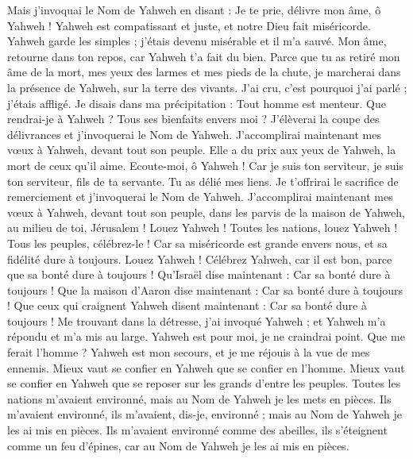 \begin{multicols}{2}
Mais j'invoquai le Nom de Yahweh en disant : Je te prie, délivre mon âme, ô Yahweh !
Yahweh est compatissant et juste, et notre Dieu fait miséricorde.
Yahweh garde les simples ; j'étais devenu misérable et il m'a sauvé.
Mon âme, retourne dans ton repos, car Yahweh t'a fait du bien.
Parce que tu as retiré mon âme de la mort, mes yeux des larmes et mes pieds de la chute,
je marcherai dans la présence de Yahweh, sur la terre des vivants.
J'ai cru, c'est pourquoi j'ai parlé ; j'étais affligé.
Je disais dans ma précipitation : Tout homme est menteur.
Que rendrai-je à Yahweh ? Tous ses bienfaits envers moi ?
J’élèverai la coupe des délivrances et j'invoquerai le Nom de Yahweh.
J’accomplirai maintenant mes vœux à Yahweh, devant tout son peuple.
Elle a du prix aux yeux de Yahweh, la mort de ceux qu’il aime.
Ecoute-moi, ô Yahweh ! Car je suis ton serviteur, je suis ton serviteur, fils de ta servante. Tu as délié mes liens.
Je t’offrirai le sacrifice de remerciement et j'invoquerai le Nom de Yahweh.
J’accomplirai maintenant mes vœux à Yahweh, devant tout son peuple,
dans les parvis de la maison de Yahweh, au milieu de toi, Jérusalem ! Louez Yahweh !
\VerseOne{}Toutes les nations, louez Yahweh ! Tous les peuples, célébrez-le !
Car sa miséricorde est grande envers nous, et sa fidélité dure à toujours. Louez Yahweh !
\VerseOne{}Célébrez Yahweh, car il est bon, parce que sa bonté dure à toujours !
Qu'Israël dise maintenant : Car sa bonté dure à toujours !
Que la maison d'Aaron dise maintenant : Car sa bonté dure à toujours !
Que ceux qui craignent Yahweh disent maintenant : Car sa bonté dure à toujours !
Me trouvant dans la détresse, j'ai invoqué Yahweh ; et Yahweh m'a répondu et m'a mis au large.
Yahweh est pour moi, je ne craindrai point. Que me ferait l'homme ?
Yahweh est mon secours, et je me réjouis à la vue de mes ennemis.
Mieux vaut se confier en Yahweh que se confier en l'homme.
Mieux vaut se confier en Yahweh que se reposer sur les grands d'entre les peuples.
Toutes les nations m'avaient environné, mais au Nom de Yahweh je les mets en pièces.
Ils m'avaient environné, ils m'avaient, dis-je, environné ; mais au Nom de Yahweh je les ai mis en pièces.
Ils m'avaient environné comme des abeilles, ils s’éteignent comme un feu d'épines, car au Nom de Yahweh je les ai mis en pièces.

\end{multicols}
